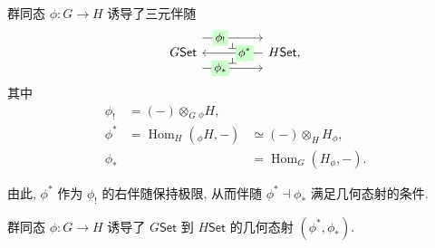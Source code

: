 \begin{prop}
	[label={group-homomorphism-adjoint-triple}]
    {}
    群同态 $\phi\colon G\to H$ 诱导了三元伴随
\[\begin{tikzcd}[every label/.append style = {font = \small},background color=\propcolor,ampersand replacement=\&]
	{G\mathsf {Set}} \&\& {H\mathsf {Set},}
	\arrow[""{name=0, anchor=center, inner sep=0}, "{\phi^*}"'{description,pos=0.3}, from=1-3, to=1-1]
	\arrow[""{name=1, anchor=center, inner sep=0}, "{\phi_*}"{description,pos=0.3}, shift right=5, from=1-1, to=1-3]
	\arrow[""{name=2, anchor=center, inner sep=0}, "{\phi_!}"{description,pos=0.3}, shift left=5, from=1-1, to=1-3]
	\arrow["\dashv"{anchor=center, rotate=-90}, draw=none, from=0, to=1]
	\arrow["\dashv"{anchor=center, rotate=-90}, draw=none, from=2, to=0]
\end{tikzcd}\]
其中
$$
\begin{array}{lll}
    \phi_! &= ({-})\otimes_G {_\phi H},& \\
    \phi^* &= \operatorname{Hom}_H ({_\phi H},-)&\simeq (-)\otimes_H H_\phi, \\
    \phi_* &&= \operatorname{Hom}_G (H_\phi,-).
\end{array}
$$
\end{prop}

由此, $\phi^*$ 作为 $\phi_!$ 的右伴随保持极限, 从而伴随 $\phi^*\dashv\phi_*$ 满足几何态射的条件.

\begin{prop}
    {}
    群同态 $\phi\colon G\to H$ 诱导了 $G\mathsf{Set}$ 到 $H\mathsf{Set}$ 的几何态射 $(\phi^*,\phi_*)$.
\end{prop}

